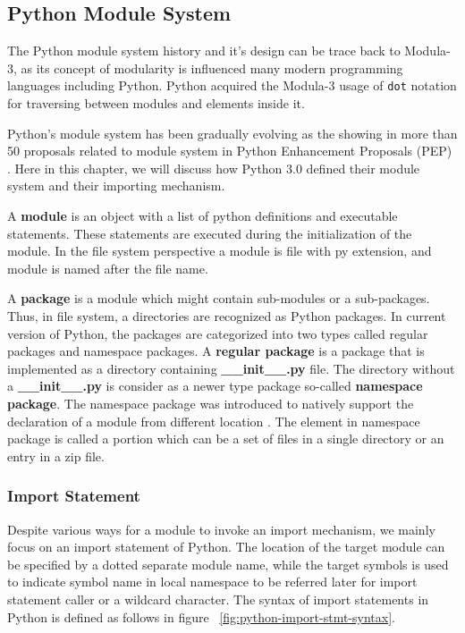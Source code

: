 


\subsection{Python Module System}

The Python module system history and it's design can be trace back to Modula-3, as its concept of modularity is influenced many modern programming languages including Python.
Python acquired the Modula-3 usage of \texttt{dot} notation for traversing between modules and elements inside it.

Python’s module system has been gradually evolving as the showing in more than 50 proposals related to module system in Python Enhancement Proposals (PEP) \cite{pep0}. Here in this chapter, we will discuss how Python 3.0 defined their module system and their importing mechanism.

A \textbf{module} is an object with a list of python definitions and executable statements. These statements are executed during the initialization of the module. In the file system perspective a module is file with py extension, and module is named after the file name.

A \textbf{package} is a module which might contain sub-modules or a sub-packages.
Thus, in file system, a directories are recognized as Python packages.
In current version of Python, the packages are categorized into two types called regular packages and namespace packages.
A \textbf{regular package} is a package that is implemented as a directory containing \textbf{\_\_init\_\_.py} file.
The directory without a \textbf{\_\_init\_\_.py} is consider as a newer type package so-called \textbf{namespace package}.
The namespace package was introduced to natively support the declaration of a module from different location \cite{pep420}. The element in namespace package is called a portion which can be a set of files in a single directory or an entry in a zip file.

\subsubsection{Import Statement}

Despite various ways for a module to invoke an import mechanism, we mainly focus on an import statement of Python.
The location of the target module can be specified by a dotted separate module name, while the target symbols is used to indicate symbol name in local namespace to be referred later for import statement caller or a wildcard character.
The syntax of import statements in Python is defined as follows in figure ~\ref{fig:python-import-stmt-syntax}.

